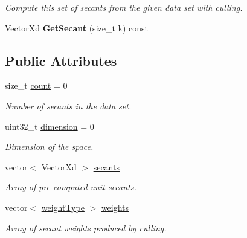 \begin{DoxyCompactItemize}
\begin{DoxyCompactList}\small\item\em Compute this set of secants from the given data set with culling. \end{DoxyCompactList}\item 
\hypertarget{struct_d_r_d_s_p_1_1_secants_a21ff677ea2698d6de90941403daa68c9}{Vector\-Xd {\bfseries Get\-Secant} (size\-\_\-t k) const }\label{struct_d_r_d_s_p_1_1_secants_a21ff677ea2698d6de90941403daa68c9}

\end{DoxyCompactItemize}
\subsection*{Public Attributes}
\begin{DoxyCompactItemize}
\item 
\hypertarget{struct_d_r_d_s_p_1_1_secants_a821f5d19109ca4f94a7fb593614ac173}{size\-\_\-t \hyperlink{struct_d_r_d_s_p_1_1_secants_a821f5d19109ca4f94a7fb593614ac173}{count} = 0}\label{struct_d_r_d_s_p_1_1_secants_a821f5d19109ca4f94a7fb593614ac173}

\begin{DoxyCompactList}\small\item\em Number of secants in the data set. \end{DoxyCompactList}\item 
\hypertarget{struct_d_r_d_s_p_1_1_secants_a950d625f7d298f93eaad20062f79db1b}{uint32\-\_\-t \hyperlink{struct_d_r_d_s_p_1_1_secants_a950d625f7d298f93eaad20062f79db1b}{dimension} = 0}\label{struct_d_r_d_s_p_1_1_secants_a950d625f7d298f93eaad20062f79db1b}

\begin{DoxyCompactList}\small\item\em Dimension of the space. \end{DoxyCompactList}\item 
\hypertarget{struct_d_r_d_s_p_1_1_secants_a1ea6387e35af61db236e3c9053fb5161}{vector$<$ Vector\-Xd $>$ \hyperlink{struct_d_r_d_s_p_1_1_secants_a1ea6387e35af61db236e3c9053fb5161}{secants}}\label{struct_d_r_d_s_p_1_1_secants_a1ea6387e35af61db236e3c9053fb5161}

\begin{DoxyCompactList}\small\item\em Array of pre-\/computed unit secants. \end{DoxyCompactList}\item 
\hypertarget{struct_d_r_d_s_p_1_1_secants_a534beb61e939e136580727be9296c8a8}{vector$<$ \hyperlink{namespace_d_r_d_s_p_a6f6649cfc0354447bca3de04bc85e19d}{weight\-Type} $>$ \hyperlink{struct_d_r_d_s_p_1_1_secants_a534beb61e939e136580727be9296c8a8}{weights}}\label{struct_d_r_d_s_p_1_1_secants_a534beb61e939e136580727be9296c8a8}

\begin{DoxyCompactList}\small\item\em Array of secant weights produced by culling. \end{DoxyCompactList}\end{DoxyCompactItemize}



